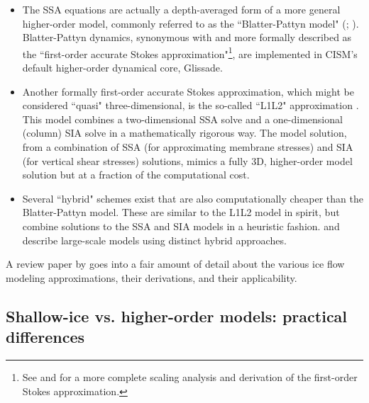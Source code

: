 \begin{itemize}
\item The SSA equations are actually a depth-averaged form of a more general higher-order model, commonly referred to as the ``Blatter-Pattyn model" (\citet{BLATTER:1995wz}; \citet{Pattyn:2003tj}). 
Blatter-Pattyn dynamics, synonymous with and more formally described as the ``first-order accurate Stokes approximation"\footnote{See \citet{Schoof:2010dl} and \citet{DUKOWICZ:2010wb} for a more complete scaling analysis and derivation of the first-order Stokes approximation.}, are implemented in CISM's default higher-order dynamical core, Glissade.
\end{itemize}

\begin{itemize}
\item Another formally first-order accurate Stokes approximation, which might be considered ``quasi" three-dimensional, is the so-called ``L1L2" approximation \citep{Schoof:2010dl}. This model combines a two-dimensional SSA solve and a one-dimensional (column) SIA solve in a mathematically rigorous way. The model solution, from a combination of SSA (for approximating membrane stresses) and SIA (for vertical shear stresses) solutions, mimics a fully 3D, higher-order model solution but at a fraction of the computational cost.
\end{itemize}

\begin{itemize}
\item Several ``hybrid" schemes exist that are also computationally cheaper than the Blatter-Pattyn model. These are similar to the L1L2 model in spirit, but combine solutions to the SSA and SIA models in a heuristic fashion. 
\citet{Bueler:2009ee} and \citet{Pollard:2009ed} describe large-scale models using distinct hybrid approaches. 
\end{itemize}

A review paper by \citet{Schoof:2013is} goes into a fair amount of detail about the various ice flow modeling approximations, their derivations, and their applicability.

\subsection{Shallow-ice vs. higher-order models: practical differences}

